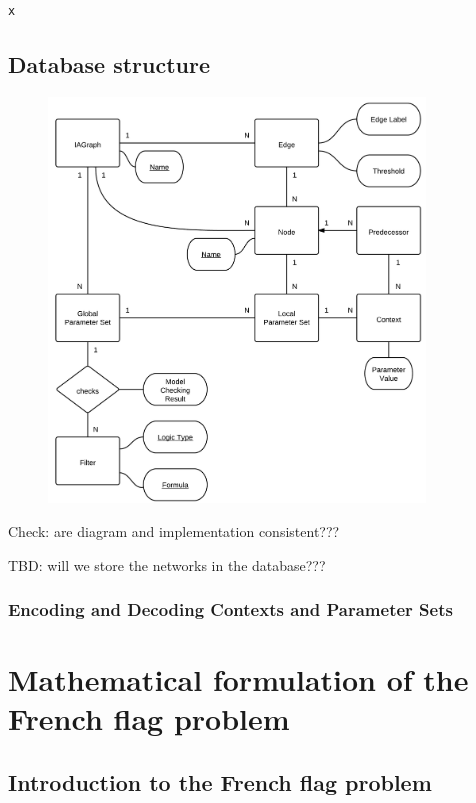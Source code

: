 \documentclass{article}
\begin{document}
\begin{flushleft}
\begin{lstlisting}[language=Python]
x
\end{lstlisting}

\subsection{Database structure}

\begin{figure}[h!]
\centering 
\includegraphics[width=10cm]{ERDiagramRegNetTool.png}
\end{figure}

Check: are diagram and implementation consistent???

TBD: will we store the networks in the database???

\subsubsection{Encoding and Decoding Contexts and Parameter Sets}

\section{Mathematical formulation of the French flag problem}

\subsection{Introduction to the French flag problem}


\end{flushleft}
\end{document}
